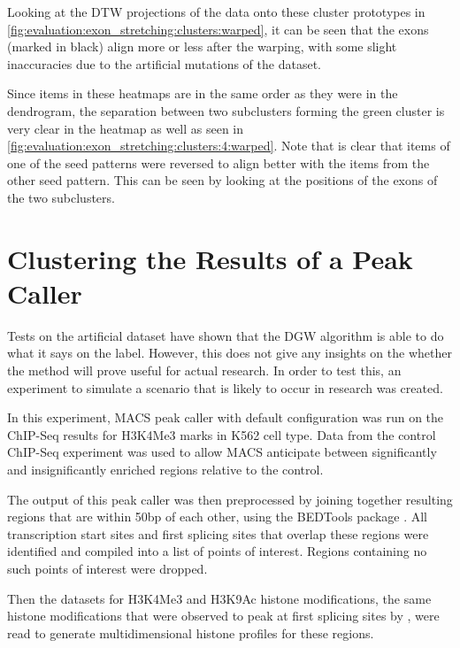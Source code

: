 \documentclass[parskip]{cs4rep}
\newcommand{\histonemodification}[1]{#1}
\newcommand{\celltype}[1]{#1}
\begin{document}
Looking at the DTW projections of the data onto these cluster prototypes in \autoref{fig:evaluation:exon_stretching:clusters:warped}, it can be seen that the exons (marked in black) align more or less after the warping, with some slight inaccuracies due to the artificial mutations of the dataset. 

Since items in these heatmaps are in the same order as they were in the dendrogram, the separation between two subclusters forming the green cluster is very clear in the heatmap as well as seen in \autoref{fig:evaluation:exon_stretching:clusters:4:warped}. Note that is clear that items of one of the seed patterns were reversed to align better with the items from the other seed pattern. This can be seen by looking at the positions of the exons of the two subclusters.

\section{Clustering the Results of a Peak Caller}
\label{sec:macs-experiment}
Tests on the artificial dataset have shown that the DGW algorithm is able to do what it says on the label. However, this does not give any insights on the whether the method will prove useful for actual research. In order to test this, an experiment to simulate a scenario that is likely to occur in research was created.

In this experiment, MACS peak caller with default configuration \cite{Zhang:2008wp} was run on the ChIP-Seq results for \histonemodification{H3K4Me3} marks in \celltype{K562} cell type. Data from the control ChIP-Seq experiment was used to allow MACS anticipate between significantly and insignificantly enriched regions relative to the control.

The output of this peak caller was then preprocessed by joining together resulting regions that are within 50bp of each other, using the BEDTools package \cite{Quinlan:2010ur}. 
All transcription start sites and first splicing sites that overlap these regions were identified and compiled into a list of points of interest. Regions containing no such points of interest were dropped.

Then the datasets for \histonemodification{H3K4Me3} and \histonemodification{H3K9Ac} histone modifications, the same histone modifications that were observed to peak at first splicing sites by \cite{Bieberstein:2012tf}, were read to generate multidimensional histone profiles for these regions.
\end{document}
